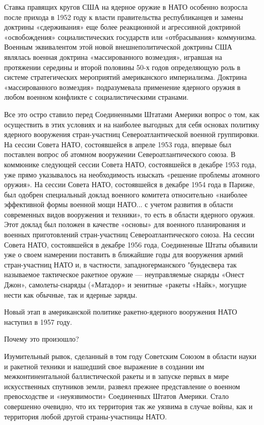 \documentclass[12pt, a4paper, openany]{book}
\begin{document}
	Ставка правящих кругов США на ядерное оружие в НАТО особенно возросла после прихода в 1952 году к власти правительства республиканцев и замены доктрины «сдерживания» еще более реакционной и агрессивной доктриной «освобождения» социалистических государств или «отбрасывания» коммунизма. Военным эквивалентом этой новой внешнеполитической доктрины США являлась военная доктрина «массированного возмездия», игравшая на протяжении середины и второй половины 50-х годов определяющую роль в системе стратегических мероприятий американского империализма. Доктрина «массированного возмездия» подразумевала применение ядерного оружия в любом военном конфликте с социалистическими странами.
	
	Все это остро ставило перед Соединенными Штатами Америки вопрос о том, как осуществить в этих условиях и на наиболее выгодных для себя основах политику ядерного вооружения стран-участниц Североатлантической военной группировки. На сессии Совета НАТО, состоявшейся в апреле 1953 года, впервые был поставлен вопрос об атомном вооружении Североатлантического союза. В коммюнике следующей сессии Совета НАТО, состоявшейся в декабре 1953 года, уже прямо указывалось на необходимость изыскать «решение проблемы атомного оружия». На сессии Совета НАТО, состоявшейся в декабре 1954 года в Париже, был одобрен специальный доклад военного комитета относительно «наиболее эффективной формы военной мощи НАТО... с учетом развития в области современных видов вооружения и техники», то есть в области ядерного оружия. Этот доклад был положен в качестве «основы» для военного планирования и военных приготовлений стран-участниц Североатлантического союза. На сессии Совета НАТО, состоявшейся в декабре 1956 года, Соединенные Штаты объявили уже о своем намерении поставить в ближайшие годы для вооружения армий стран-участниц НАТО и, в частности, западногерманского "бундесвера так называемое тактическое ракетное оружие — неуправляемые снаряды «Онест Джон», самолеты-снаряды («Матадор» и зенитные «ракеты «Найк», могущие нести как обычные, так и ядерные заряды.
	
	Новый этап в американской политике ракетно-ядерного вооружения НАТО наступил в 1957 году.
	
	Почему это произошло?
	
	
	Изумительный рывок, сделанный в том году Советским Союзом в области науки и ракетной техники и нашедший свое выражение в создании им межконтинентальной баллистической ракеты и в запуске первых в мире искусственных спутников земли, развеял прежнее представление о военном превосходстве и «неуязвимости» Соединенных Штатов Америки. Стало совершенно очевидно, что их территория так же уязвима в случае войны, как и территория любой другой страны-участницы НАТО.
	
\end{document}
